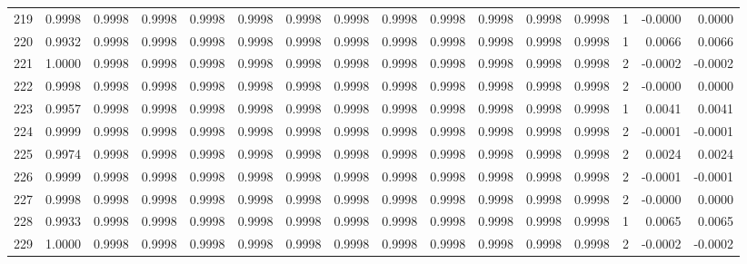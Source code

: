 \begin{tabular}{lrrrrrrrrrrrrrrr}
219 &      0.9998 &  0.9998 &  0.9998 &  0.9998 &  0.9998 &  0.9998 &  0.9998 &  0.9998 &  0.9998 &  0.9998 &   0.9998 &     0.9998 &      1 &                   -0.0000 &                     0.0000 \\
220 &      0.9932 &  0.9998 &  0.9998 &  0.9998 &  0.9998 &  0.9998 &  0.9998 &  0.9998 &  0.9998 &  0.9998 &   0.9998 &     0.9998 &      1 &                    0.0066 &                     0.0066 \\
221 &      1.0000 &  0.9998 &  0.9998 &  0.9998 &  0.9998 &  0.9998 &  0.9998 &  0.9998 &  0.9998 &  0.9998 &   0.9998 &     0.9998 &      2 &                   -0.0002 &                    -0.0002 \\
222 &      0.9998 &  0.9998 &  0.9998 &  0.9998 &  0.9998 &  0.9998 &  0.9998 &  0.9998 &  0.9998 &  0.9998 &   0.9998 &     0.9998 &      2 &                   -0.0000 &                     0.0000 \\
223 &      0.9957 &  0.9998 &  0.9998 &  0.9998 &  0.9998 &  0.9998 &  0.9998 &  0.9998 &  0.9998 &  0.9998 &   0.9998 &     0.9998 &      1 &                    0.0041 &                     0.0041 \\
224 &      0.9999 &  0.9998 &  0.9998 &  0.9998 &  0.9998 &  0.9998 &  0.9998 &  0.9998 &  0.9998 &  0.9998 &   0.9998 &     0.9998 &      2 &                   -0.0001 &                    -0.0001 \\
225 &      0.9974 &  0.9998 &  0.9998 &  0.9998 &  0.9998 &  0.9998 &  0.9998 &  0.9998 &  0.9998 &  0.9998 &   0.9998 &     0.9998 &      2 &                    0.0024 &                     0.0024 \\
226 &      0.9999 &  0.9998 &  0.9998 &  0.9998 &  0.9998 &  0.9998 &  0.9998 &  0.9998 &  0.9998 &  0.9998 &   0.9998 &     0.9998 &      2 &                   -0.0001 &                    -0.0001 \\
227 &      0.9998 &  0.9998 &  0.9998 &  0.9998 &  0.9998 &  0.9998 &  0.9998 &  0.9998 &  0.9998 &  0.9998 &   0.9998 &     0.9998 &      2 &                   -0.0000 &                     0.0000 \\
228 &      0.9933 &  0.9998 &  0.9998 &  0.9998 &  0.9998 &  0.9998 &  0.9998 &  0.9998 &  0.9998 &  0.9998 &   0.9998 &     0.9998 &      1 &                    0.0065 &                     0.0065 \\
229 &      1.0000 &  0.9998 &  0.9998 &  0.9998 &  0.9998 &  0.9998 &  0.9998 &  0.9998 &  0.9998 &  0.9998 &   0.9998 &     0.9998 &      2 &                   -0.0002 &                    -0.0002 \\

\end{tabular}
